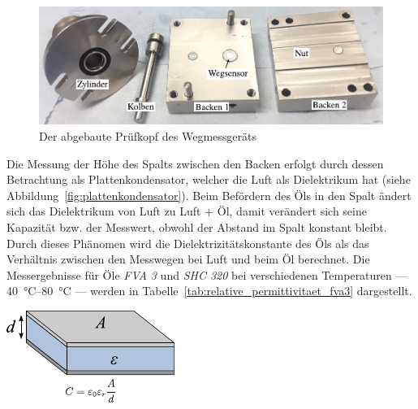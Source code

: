 \begin{figure}[htb]
    \centering
    \includegraphics[]{./images/wegmessgeraet_pruefkopf.pdf}
    \caption{Der abgebaute Prüfkopf des Wegmessgeräts}
    \label{fig:wegmessgeraet_pruefkopf}
\end{figure}

Die Messung der Höhe des Spalts zwischen den Backen erfolgt durch dessen Betrachtung als Plattenkondensator, welcher die Luft als Dielektrikum hat (siehe Abbildung~\ref{fig:plattenkondensator}).
Beim Befördern des Öls in den Spalt ändert sich das Dielektrikum von Luft zu Luft + Öl, damit verändert sich seine Kapazität bzw. der Messwert, obwohl der Abstand im Spalt konstant bleibt.
Durch dieses Phänomen wird die Dielektrizitätskonstante des Öls als das Verhältnis zwischen den Messwegen bei Luft und beim Öl berechnet.
Die Messergebnisse für Öle \textit{FVA 3} und \textit{SHC 320} bei verschiedenen Temperaturen --- \SIrange{40}{80}{\degreeCelsius} --- werden in Tabelle~\ref{tab:relative_permittivitaet_fva3} dargestellt.

\begin{minipage}[b]{0.55\linewidth}
    \centering
    
    \label{tab:relative_permittivitaet_fva3}
\end{minipage}
\hspace{0.5cm}
%
\begin{minipage}[b]{0.3\linewidth}
    \centering
    \includegraphics[width=\textwidth]{./images/plattenkondensator.pdf}
    \label{fig:plattenkondensator}
\end{minipage}

